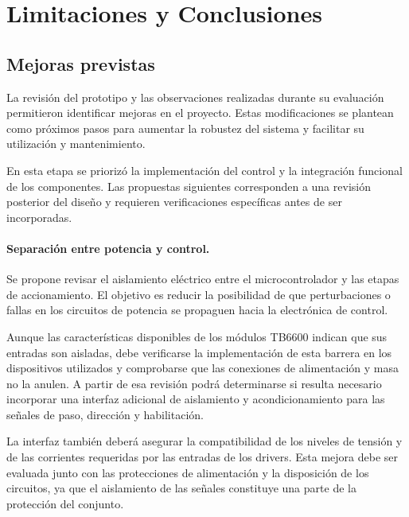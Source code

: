 \documentclass[blue,fullpaper]{ludusofficial}  %
\begin{document}

\section{Limitaciones y Conclusiones}
\subsection{Mejoras previstas}

La revisión del prototipo y las observaciones realizadas
durante su evaluación permitieron identificar mejoras
en el proyecto. Estas modificaciones
se plantean como próximos pasos para aumentar la
robustez del sistema y facilitar su utilización
y mantenimiento.

En esta etapa se priorizó la implementación del control
y la integración funcional de los componentes.
Las propuestas siguientes corresponden a una revisión
posterior del diseño y requieren verificaciones
específicas antes de ser incorporadas.

\paragraph{Separación entre potencia y control.}

Se propone revisar el aislamiento eléctrico entre
el microcontrolador y las etapas de accionamiento.
El objetivo es reducir la posibilidad de que
perturbaciones o fallas en los circuitos de potencia
se propaguen hacia la electrónica de control.

Aunque las características disponibles de los módulos
TB6600 indican que sus entradas son aisladas,
debe verificarse la implementación de esta barrera
en los dispositivos utilizados y comprobarse
que las conexiones de alimentación y masa
no la anulen. A partir de esa revisión podrá
determinarse si resulta necesario incorporar
una interfaz adicional de aislamiento y
acondicionamiento para las señales de paso,
dirección y habilitación.

La interfaz también deberá asegurar la compatibilidad
de los niveles de tensión y de las corrientes
requeridas por las entradas de los drivers.
Esta mejora debe ser evaluada junto con las
protecciones de alimentación y la disposición
de los circuitos, ya que el aislamiento de
las señales constituye una parte de la protección
del conjunto.
\end{document}
